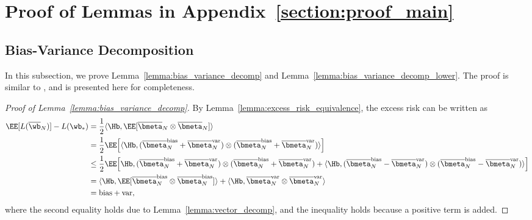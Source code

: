 \documentclass[11pt]{article}
\newcommand{\owb}{\overline{\wb}}
\newcommand{\obmeta}{\overline{\bmeta}}
\begin{document}
\section{Proof of Lemmas in Appendix~\ref{section:proof_main}}\label{section:Proof_proof_EMA_excess_risk}

\subsection{Bias-Variance Decomposition}\label{subsection:bias_variance_decomp}

In this subsection, we prove Lemma~\ref{lemma:bias_variance_decomp} and Lemma~\ref{lemma:bias_variance_decomp_lower}. The proof is similar to \citet{zou2021benign}, and is presented here for completeness.
\begin{proof}[Proof of Lemma~\ref{lemma:bias_variance_decomp}]
By Lemma~\ref{lemma:excess_risk_equivalence}, the excess risk can be written as
\begin{align*}
\EE[L(\owb_N)]-L(\wb_*)&=\frac12\langle\Hb, \EE[\obmeta_N\otimes\obmeta_N]\rangle\\
&=\frac12\EE\Big[\langle\Hb, (\obmeta_N^{\mathrm{bias}}+\obmeta_N^{\mathrm{var}})\otimes(\obmeta_N^{\mathrm{bias}}+\obmeta_N^{\mathrm{var}})\rangle\Big]\\
&\le\frac12\EE\Big[\Hb, (\obmeta_N^{\mathrm{bias}}+\obmeta_N^{\mathrm{var}})\otimes(\obmeta_N^{\mathrm{bias}}+\obmeta_N^{\mathrm{var}})+\langle\Hb, (\obmeta_N^{\mathrm{bias}}-\obmeta_N^{\mathrm{var}})\otimes(\obmeta_N^{\mathrm{bias}}-\obmeta_N^{\mathrm{var}})\rangle\Big]\\
&=\langle\Hb, \EE[\obmeta_N^{\mathrm{bias}}\otimes\obmeta_N^{\mathrm{bias}}]\rangle+\langle\Hb, \obmeta_N^{\mathrm{var}}\otimes\obmeta_N^{\mathrm{var}}\rangle\\
&=\mathrm{bias}+\mathrm{var},
\end{align*}
where the second equality holds due to Lemma~\ref{lemma:vector_decomp}, and the inequality holds because a positive term is added.
\end{proof}
\end{document}
